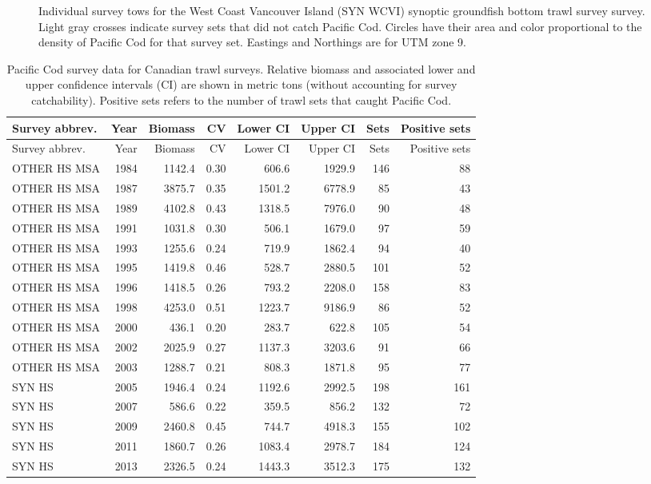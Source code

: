 \documentclass[11pt]{book}
\begin{document}
\begin{figure}[htb]

{\centering {} 

}

\caption{Individual survey tows for the West Coast Vancouver Island (SYN WCVI) synoptic groundfish bottom trawl survey survey. Light gray crosses indicate survey sets that did not catch Pacific Cod. Circles have their area and color proportional to the density of Pacific Cod for that survey set. Eastings and Northings are for UTM zone 9.}\label{fig:survey-maps-syn-wcvi}
\end{figure}
\clearpage
\begin{longtable}[]{@{}lrrrrrrr@{}}
\caption{\label{tab:surv-canadian-table}Pacific Cod survey data for Canadian trawl surveys. Relative biomass and associated lower and upper confidence intervals (CI) are shown in metric tons (without accounting for survey catchability). Positive sets refers to the number of trawl sets that caught Pacific Cod.}\tabularnewline
\toprule
Survey abbrev. & Year & Biomass & CV & Lower CI & Upper CI & Sets & Positive sets\tabularnewline
\midrule
\endfirsthead
\toprule
Survey abbrev. & Year & Biomass & CV & Lower CI & Upper CI & Sets & Positive sets\tabularnewline
\midrule
\endhead
OTHER HS MSA & 1984 & 1142.4 & 0.30 & 606.6 & 1929.9 & 146 & 88\tabularnewline
OTHER HS MSA & 1987 & 3875.7 & 0.35 & 1501.2 & 6778.9 & 85 & 43\tabularnewline
OTHER HS MSA & 1989 & 4102.8 & 0.43 & 1318.5 & 7976.0 & 90 & 48\tabularnewline
OTHER HS MSA & 1991 & 1031.8 & 0.30 & 506.1 & 1679.0 & 97 & 59\tabularnewline
OTHER HS MSA & 1993 & 1255.6 & 0.24 & 719.9 & 1862.4 & 94 & 40\tabularnewline
OTHER HS MSA & 1995 & 1419.8 & 0.46 & 528.7 & 2880.5 & 101 & 52\tabularnewline
OTHER HS MSA & 1996 & 1418.5 & 0.26 & 793.2 & 2208.0 & 158 & 83\tabularnewline
OTHER HS MSA & 1998 & 4253.0 & 0.51 & 1223.7 & 9186.9 & 86 & 52\tabularnewline
OTHER HS MSA & 2000 & 436.1 & 0.20 & 283.7 & 622.8 & 105 & 54\tabularnewline
OTHER HS MSA & 2002 & 2025.9 & 0.27 & 1137.3 & 3203.6 & 91 & 66\tabularnewline
OTHER HS MSA & 2003 & 1288.7 & 0.21 & 808.3 & 1871.8 & 95 & 77\tabularnewline
SYN HS & 2005 & 1946.4 & 0.24 & 1192.6 & 2992.5 & 198 & 161\tabularnewline
SYN HS & 2007 & 586.6 & 0.22 & 359.5 & 856.2 & 132 & 72\tabularnewline
SYN HS & 2009 & 2460.8 & 0.45 & 744.7 & 4918.3 & 155 & 102\tabularnewline
SYN HS & 2011 & 1860.7 & 0.26 & 1083.4 & 2978.7 & 184 & 124\tabularnewline
SYN HS & 2013 & 2326.5 & 0.24 & 1443.3 & 3512.3 & 175 & 132\tabularnewline

\end{longtable}
\end{document}
